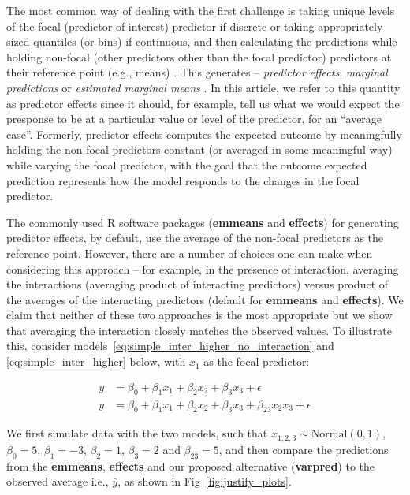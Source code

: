 \documentclass[10pt,letterpaper]{article}
\newcommand{\pkg}[1]{\textbf{#1}}
\let\proglang=\textsf
\begin{document}
The most common way of dealing with the first challenge is taking unique levels of the focal (predictor of interest) predictor if discrete or taking appropriately sized quantiles (or bins) if continuous, and then calculating the predictions while holding non-focal (other predictors other than the focal predictor) predictors at their reference point (e.g., means) \cite{hanmer2013behind}. This generates -- \emph{predictor effects}\cite{fox2009effect}, \emph{marginal predictions} \cite{leeper2017package} or \emph{estimated marginal means} \cite{lenth2018package}. In this article, we refer to this quantity as predictor effects since it should, for example, tell us what we would expect the presponse to be at a particular value or level of the predictor, for an ``average case''. Formerly, predictor effects computes the expected outcome by meaningfully holding the non-focal predictors constant (or averaged in some meaningful way) while varying the focal predictor, with the goal that the outcome expected prediction represents how the model responds to the changes in the focal predictor.

The commonly used \proglang{R} software packages (\pkg{emmeans} and \pkg{effects}) for generating predictor effects, by default, use the average of the non-focal predictors as the reference point. However, there are a number of choices one can make when considering this approach -- for example, in the presence of interaction, averaging the interactions (averaging product of interacting predictors) versus product of the averages of the interacting predictors (default for \pkg{emmeans} and \pkg{effects}). We claim that neither of these two approaches is the most appropriate but we show that averaging the interaction closely matches the observed values. To illustrate this, consider models~\ref{eq:simple_inter_higher_no_interaction} and \ref{eq:simple_inter_higher} below, with $x_1$ as the focal predictor:

%
\begin{align}
y &= \beta_0 + \beta_1x_1 + \beta_2x_2 + \beta_3x_3 + \epsilon \label{eq:simple_inter_higher_no_interaction}\\
y &= \beta_0 + \beta_1x_1 + \beta_2x_2 + \beta_3x_3 + \beta_{23}x_2x_3 + \epsilon \label{eq:simple_inter_higher}
\end{align}
%

We first simulate data with the two models, such that $x_{1,2,3} \sim \mathrm{Normal}(0, 1)$, $\beta_0 = 5$, $\beta_1 = -3$, $\beta_2 = 1$, $\beta_3 = 2$ and $\beta_{23} = 5$, and then compare the predictions from the \pkg{emmeans}, \pkg{effects} and our proposed alternative (\pkg{varpred}) to the observed average i.e., $\bar{y}$, as shown in Fig~\ref{fig:justify_plots}.
\end{document}
